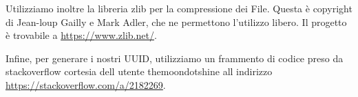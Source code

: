 \documentclass[11pt]{article}
\begin{document}
\begin{flushleft}
Utilizziamo inoltre la libreria zlib per la compressione dei File. Questa è copyright di Jean-loup Gailly e Mark Adler, che ne permettono l'utilizzo libero. Il progetto è trovabile a \url{https://www.zlib.net/}.

Infine, per generare i nostri UUID, utilizziamo un frammento di codice preso da stackoverflow cortesia dell utente themoondotshine all indirizzo \url{https://stackoverflow.com/a/2182269}.

\end{flushleft}
\end{document}
